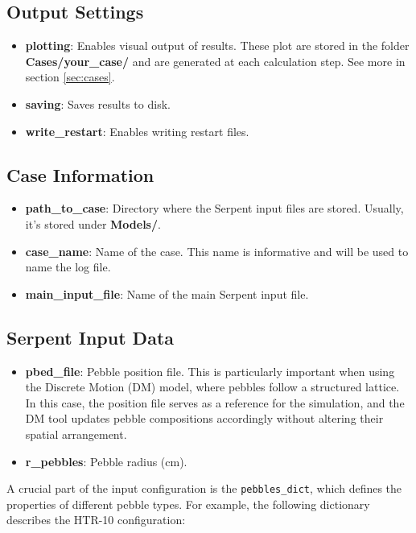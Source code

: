\documentclass{article}
\begin{document}
\subsection{Output Settings}
\begin{itemize}
    \item \textbf{plotting}: Enables visual output of results. These plot are stored in the folder \textbf{Cases/your\_case/} and are generated at each calculation step. See more in section \ref{sec:cases}.
    \item \textbf{saving}: Saves results to disk.
    \item \textbf{write\_restart}: Enables writing restart files.
\end{itemize}

\subsection{Case Information}
\begin{itemize}
    \item \textbf{path\_to\_case}: Directory where the Serpent input files are stored. Usually, it's stored under \textbf{Models/}.
    \item \textbf{case\_name}: Name of the case. This name is informative and will be used to name the log file. 
    \item \textbf{main\_input\_file}: Name of the main Serpent input file.
\end{itemize}

\subsection{Serpent Input Data}
\begin{itemize}
    \item \textbf{pbed\_file}: Pebble position file. This is particularly important when using the Discrete Motion (DM) model, where pebbles follow a structured lattice. In this case, the position file serves as a reference for the simulation, and the DM tool updates pebble compositions accordingly without altering their spatial arrangement.
    \item \textbf{r\_pebbles}: Pebble radius (cm).
\end{itemize}

A crucial part of the input configuration is the \texttt{pebbles\_dict}, which defines the properties of different pebble types. For example, the following dictionary describes the HTR-10 configuration:
\end{document}

